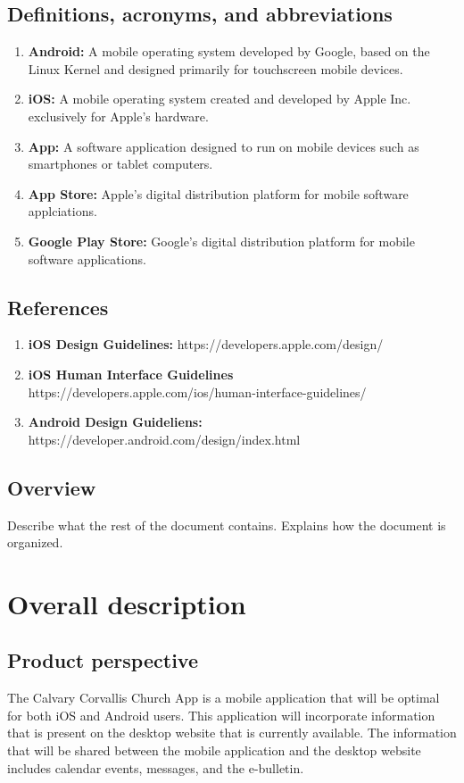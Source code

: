 \documentclass[letterpaper,10pt,draftclsnofoot,onecolumn,titlepage]{IEEEtran}
\begin{document}
	\subsection{Definitions, acronyms, and abbreviations}

	\begin{enumerate}
		\item \textbf{Android:} A mobile operating system developed by Google, based on the Linux Kernel and designed primarily for touchscreen mobile devices.
		\item \textbf{iOS:} A mobile operating system created and developed by Apple Inc. exclusively for Apple's hardware.
		\item \textbf{App:} A software application designed to run on mobile devices such as smartphones or tablet computers.
		\item \textbf{App Store:} Apple's digital distribution platform for mobile software applciations.
		\item \textbf{Google Play Store:} Google's digital distribution platform for mobile software applications.
	\end{enumerate}

	\subsection{References}
	\begin{enumerate}
		\item \textbf{iOS Design Guidelines:} https://developers.apple.com/design/
		\item \textbf{iOS Human Interface Guidelines} https://developers.apple.com/ios/human-interface-guidelines/
		\item \textbf{Android Design Guideliens:} https://developer.android.com/design/index.html
	\end{enumerate}

	\subsection{Overview}
	Describe what the rest of the document contains.
	Explains how the document is organized.

	\section{Overall description}
	\subsection{Product perspective}
	The Calvary Corvallis Church App is a mobile application that will be optimal for both iOS and Android users.
	This application will incorporate information that is present on the desktop website that is currently available.
	The information that will be shared between the mobile application and the desktop website includes calendar events, messages, and the e-bulletin.
\end{document}
